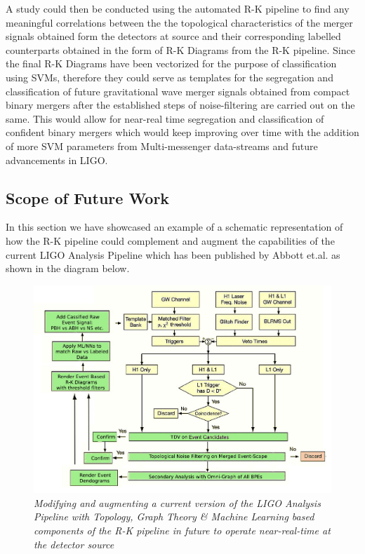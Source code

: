 A study could then be conducted using the automated R-K pipeline to find any meaningful correlations between the the topological characteristics of the merger signals obtained form the detectors at source and their corresponding labelled counterparts obtained in the form of R-K Diagrams from the R-K pipeline. Since the final R-K Diagrams have been vectorized for the purpose of classification using SVMs, therefore they could serve as templates for the segregation and classification of future gravitational wave merger signals  obtained from compact binary mergers after the established steps of noise-filtering are carried out on the same. This would allow for near-real time segregation and classification of confident binary mergers which would keep improving over time with the addition of more SVM parameters from Multi-messenger data-streams and future advancements in LIGO. 

 \subsection{Scope of Future Work}

In this section we have showcased an example of a schematic representation of how the R-K pipeline could complement and augment the capabilities of  the current LIGO Analysis Pipeline which has been published by Abbott et.al. \cite{00.6_LIGOAnalysisPipeline} as shown in the diagram below.

\begin{figure}[H]
	\centering
	\includegraphics[width=1.0\linewidth]{images/Modified-TDA-LIGO-Analysis-Pipeline.jpg}
	\caption{\textit{Modifying and augmenting a current version of the LIGO Analysis Pipeline with
			Topology, Graph Theory \& Machine Learning based components of the R-K pipeline in future to operate near-real-time at the detector source}}
	\label{fig:odified-TDA-LIGO-Analysis-Pipeline}
\end{figure}

